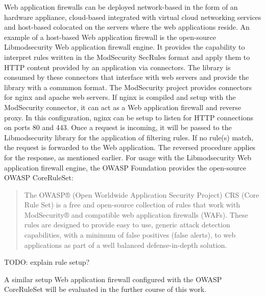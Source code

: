 Web application firewalls can be deployed network-based in the form of an hardware appliance, cloud-based integrated with virtual cloud networking services and host-based colocated on the servers where the web applications reside. \cite{palo/waf}
An example of a host-based Web application firewall is the open-source Libmodsecurity Web application firewall engine.
It provides the capability to interpret rules written in the ModSecurity SecRules format and apply them to HTTP content provided by an application via connectors.
The library is consumed by these connectors that interface with web servers and provide the library with a commmon format.
The ModSecurity project provides connectors for nginx and apache web servers.
If nginx is compiled and setup with the ModSecurity connector, it can act as a Web application firewall and reverse proxy. \cite{modsec/home, modsec/nginx}
In this configuration, nginx can be setup to listen for HTTP connections on ports 80 and 443.
Once a request is incoming, it will be passed to the Libmodsecurity library for the application of filtering rules.
If no rule(s) match, the request is forwarded to the Web application. The reversed procedure applies for the response, as mentioned earlier.
For usage with the Libmodsecurity Web application firewall engine, the OWASP Foundation provides the open-source OWASP CoreRuleSet:

\begin{quote}
	The OWASP® (Open Worldwide Application Security Project) CRS (Core Rule Set) is a free and open-source collection of rules that work with ModSecurity® and compatible web application firewalls (WAFs). These rules are designed to provide easy to use, generic attack detection capabilities, with a minimum of false positives (false alerts), to web applications as part of a well balanced defense-in-depth solution. \cite{OWASP/crshome}
\end{quote}

{\color{red} TODO: explain rule setup?}

A similar setup Web application firewall configured with the OWASP CoreRuleSet will be evaluated in the further course of this work.
